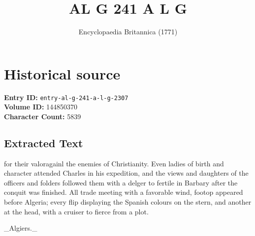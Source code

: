 \documentclass{article}
\title{AL G 241 A L G}
\date{Encyclopaedia Britannica (1771)}
\begin{document}
\maketitle

\section*{Historical source}
\textbf{Entry ID:} \texttt{entry-al-g-241-a-l-g-2307} \\
\textbf{Volume ID:} 144850370 \\
\textbf{Character Count:} 5839

\subsection*{Extracted Text}
for their valoragainl the enemies of Christianity. Even ladies of birth and character attended Charles in his expedition, and the views and daughters of the officers and folders followed them with a delger to fertile in Barbary after the conquit was finished. All trade meeting with a favorable wind, footop appeared before Algeria; every flip displaying the Spanish colours on the stern, and another at the head, with a cruiser to fierce from a plot.

\_Algiers.\_
\end{document}
